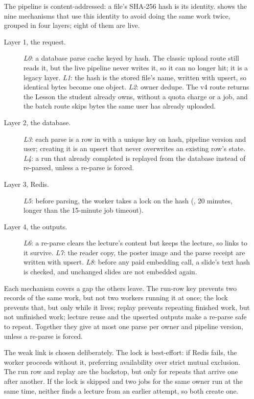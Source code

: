 The pipeline is content-addressed: a file's SHA-256 hash is its identity.
 shows the nine mechanisms that use this identity to avoid
doing the same work twice, grouped in four layers; eight of them are live.
\begin{description}
  \item[Layer 1, the request.] \emph{L0}: a database parse cache keyed by hash.
    The classic upload route still reads it, but the live pipeline never writes
    it, so it can no longer hit; it is a legacy layer. \emph{L1}: the hash is the
    stored file's name, written with upsert, so identical bytes become one
    object. \emph{L2}: owner dedupe. The v4 route returns the Lesson the student
    already owns, without a quota charge or a job, and the batch route skips
    bytes the same user has already uploaded.
  \item[Layer 2, the database.] \emph{L3}: each parse is a row in
     with a unique key on hash, pipeline version and user;
    creating it is an upsert that never overwrites an existing row's state.
    \emph{L4}: a run that already completed is replayed from the database
    instead of re-parsed, unless a re-parse is forced.
  \item[Layer 3, Redis.] \emph{L5}: before parsing, the worker takes a lock on
    the hash (, 20 minutes, longer than the 15-minute job timeout).
  \item[Layer 4, the outputs.] \emph{L6}: a re-parse clears the lecture's content
    but keeps the lecture, so links to it survive. \emph{L7}: the reader copy, the
    poster image and the parse receipt are written with upsert. \emph{L8}: before
    any paid embedding call, a slide's text hash is checked, and unchanged
    slides are not embedded again.
\end{description}
Each mechanism covers a gap the others leave. The run-row key prevents two
records of the same work, but not two workers running it at once; the lock
prevents that, but only while it lives; replay prevents repeating finished work,
but not unfinished work; lecture reuse and the upserted outputs make a re-parse
safe to repeat. Together they give at most one parse per owner and pipeline
version, unless a re-parse is forced.

The weak link is chosen deliberately. The lock is best-effort: if Redis fails,
the worker proceeds without it, preferring availability over strict mutual
exclusion. The run row and replay are the backstop, but only for repeats that
arrive one after another. If the lock is skipped and two jobs for the same owner
run at the same time, neither finds a lecture from an earlier attempt, so both
create one.

